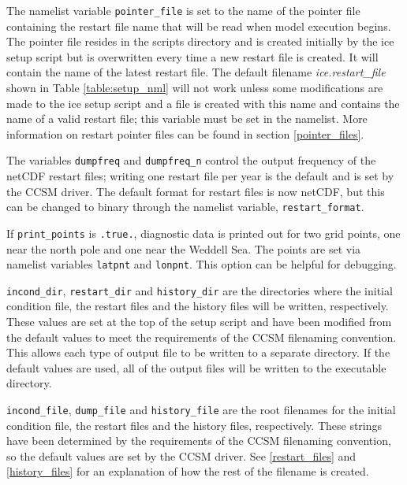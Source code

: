 The namelist variable {\tt pointer\_file} is set to the name of the pointer file
containing the restart file name that will be read when model execution
begins.  The pointer file resides in the scripts directory and is created 
initially by the ice setup script but is overwritten every time a new restart 
file is created.  It will contain the name of the latest restart file.  The 
default filename {\it ice.restart\_file} shown in Table 
\ref{table:setup_nml} will not work unless some modifications are made to 
the ice setup script and a file is created with this name and contains the name 
of a valid restart file; this variable must be set in the namelist.  More 
information on restart pointer files can be found in section \ref{pointer_files}.

The variables {\tt dumpfreq} and {\tt dumpfreq\_n} control the 
output frequency of the netCDF restart files; writing one restart file per 
year is the default and is set by the CCSM driver. The default format for
restart files is now netCDF, but this can be changed to binary through
the namelist variable, {\tt restart\_format}.

If {\tt print\_points} is {\tt .true.}, diagnostic data is printed out for two
grid points, one near the north pole and one near the Weddell Sea.  The points
are set via namelist variables {\tt latpnt} and {\tt lonpnt}.  This option can 
be helpful for debugging.

{\tt incond\_dir}, {\tt restart\_dir} and {\tt history\_dir} are the directories
where the initial condition file, the restart files and the history files will
be written, respectively.  These values are set at the top of the setup script
and have been modified from the default values to meet the requirements of the
CCSM filenaming convention.  This allows each type of output file to be written
to a separate directory.  If the default values are used, all of the output
files will be written to the executable directory.

{\tt incond\_file}, {\tt dump\_file} and {\tt history\_file} are the root
filenames for the initial condition file, the restart files and the history 
files, respectively.  These strings have been determined by the requirements 
of the CCSM filenaming convention, so the default values are set by the CCSM
driver.  See \ref{restart_files} and \ref{history_files} for an explanation 
of how the rest of the filename is created.


